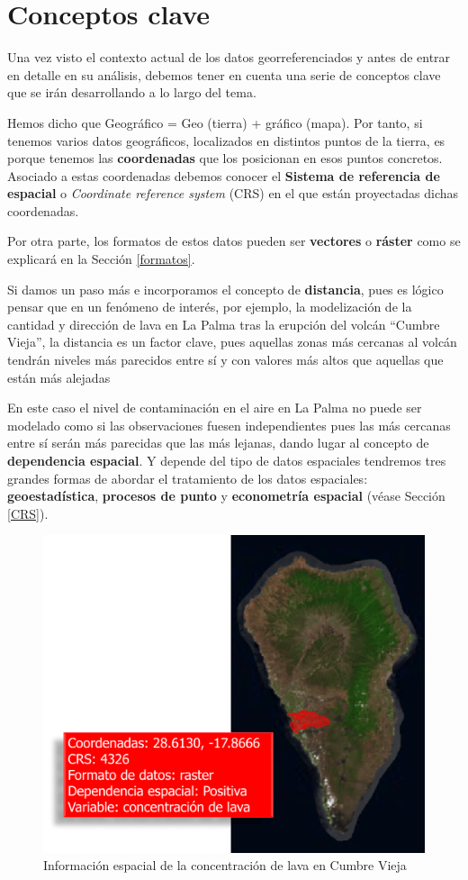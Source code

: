 \documentclass[
]{book}
\theoremstyle{definition}
\theoremstyle{definition}
\theoremstyle{definition}
\theoremstyle{definition}
\theoremstyle{remark}
\begin{document}
\hypertarget{conceptos-clave}{%
\section{Conceptos clave}\label{conceptos-clave}}

Una vez visto el contexto actual de los datos georreferenciados y antes de
entrar en detalle en su análisis, debemos tener en cuenta una serie de conceptos
clave que se irán desarrollando a lo largo del tema.

Hemos dicho que Geográfico = Geo (tierra) + gráfico (mapa). Por tanto, si
tenemos varios datos geográficos, localizados en distintos puntos de la tierra,
es porque tenemos las \textbf{coordenadas} que los posicionan en esos puntos
concretos. Asociado a estas coordenadas debemos conocer el \textbf{Sistema de
referencia de espacial} o \emph{Coordinate reference system} (CRS) en el que están
proyectadas dichas coordenadas.

Por otra parte, los formatos de estos datos pueden ser \textbf{vectores} o \textbf{ráster}
como se explicará en la Sección \ref{formatos}.

Si damos un paso más e incorporamos el concepto de \textbf{distancia}, pues es lógico
pensar que en un fenómeno de interés, por ejemplo, la modelización de la
cantidad y dirección de lava en La Palma tras la erupción del volcán ``Cumbre
Vieja'', la distancia es un factor clave, pues aquellas zonas más cercanas al
volcán tendrán niveles más parecidos entre sí y con valores más altos que
aquellas que están más alejadas

En este caso el nivel de contaminación en el aire en La Palma no puede ser
modelado como si las observaciones fuesen independientes pues las más cercanas
entre sí serán más parecidas que las más lejanas, dando lugar al concepto de
\textbf{dependencia espacial}. Y depende del tipo de datos espaciales tendremos tres
grandes formas de abordar el tratamiento de los datos espaciales:
\textbf{geoestadística}, \textbf{procesos de punto} y \textbf{econometría espacial} (véase
Sección \ref{CRS}).

\begin{figure}

{\centering \includegraphics[width=0.6\linewidth]{img/Cumbrevieja} 

}

\caption{Información espacial de la concentración de lava en Cumbre Vieja}\label{fig:gis}
\end{figure}
\end{document}
